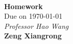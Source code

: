 \begin{titlepage}
\begin{center}
    \textbf{}
    \\[4.5cm]
    \textbf{\huge Homework}
    \\[0.3cm]
    \textnormal{Due on}
    \today
    \\[0.4cm]
    \emph{Professor Hao Wang}
    \\[8cm]
    \textbf{\Large Zeng Xiangrong}
\end{center}
\end{titlepage}

